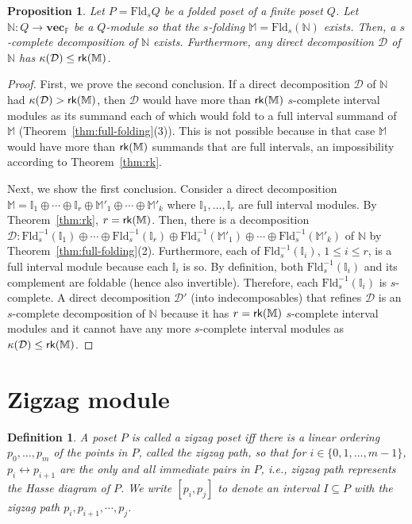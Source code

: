 \documentclass[11pt]{article}
\theoremstyle{plain}%
\newtheorem{proposition}{Proposition}[section]
\newtheorem{definition}{Definition}[section]
\newcommand{\Int}{\mathbb{I}}
\newcommand{\N}{\mathbb{N}}
\newcommand{\vecsp}{\mathbf{vec}_{\mathbb{F}}}
\newcommand{\M}{\mathbb{M}}
\newcommand{\D}{\mathcal{D}}
\newcommand{\Fld}{\mathrm{Fld}}
\newcommand{\rk}{{\sf{rk}}}
\begin{document}
\begin{proposition}
Let $P=\Fld_s Q$ be a folded poset of a finite poset $Q$.
Let $\N: Q\rightarrow \vecsp$ be a $Q$-module so that the $s$-folding
$\M=\Fld_s (\N)$ exists. Then, a $s$-complete decomposition of $\N$ exists. Furthermore, any direct decomposition $\D$ of $\N$ has $\kappa(\D)\leq \rk(\M)$.
\label{prop:complete-rank}
\end{proposition}
\begin{proof}
First, we prove the second conclusion. If a direct decomposition $\D$ of $\N$ had $\kappa(\D)>\rk(\M)$, then $\D$ would have more than $\rk(\M)$ $s$-complete interval modules as its summand each of which would fold to a full interval summand of $\M$ (Theorem~\ref{thm:full-folding}(3)). This is not possible because in that case $\M$ would have more than $\rk(\M)$ summands that are full intervals, an impossibility according to Theorem~\ref{thm:rk}.

Next, we show the first conclusion.
Consider a direct decomposition
$\M=\Int_1\oplus\cdots\oplus\Int_r\oplus \M'_1\oplus\cdots\oplus\M'_k$ where $\Int_1,\ldots,\Int_r$
are full interval modules. By Theorem~\ref{thm:rk}, $r=\rk(\M)$. Then, there is 
a decomposition $\D: \Fld_s^{-1}(\Int_1)\oplus\cdots\oplus\Fld_s^{-1}(\Int_r)\oplus \Fld_s^{-1}(\M'_1)\oplus\cdots\oplus\Fld_s^{-1}(\M'_k)$ of $\N$ by Theorem~\ref{thm:full-folding}(2). Furthermore, each of $\Fld_s^{-1}(\Int_i)$, $1\leq i\leq r$, is a full interval module because each $\Int_i$ is so. By definition, both $\Fld_s^{-1}(\Int_i)$ and its complement are foldable (hence also invertible). Therefore, each $\Fld_s^{-1}(\Int_i)$ is $s$-complete. A direct decomposition $\D'$ (into indecomposables) that refines $\D$
is an $s$-complete decomposition of $\N$ because it has $r=\rk(\M)$ $s$-complete
interval modules and it cannot have any more $s$-complete interval modules as $\kappa(\D)\leq \rk(\M)$. 
\end{proof}

\section{Zigzag module}
\label{sec:zigzag}
\begin{definition}
A poset $P$ is called a \emph{zigzag} poset iff there is a 
linear ordering $p_0,\ldots,p_m$
of the points in $P$, called the \emph{zigzag} path, so that 
for $i\in \{0,1,\ldots, m-1\}$, $p_i\leftrightarrow p_{i+1}$ are the only and all immediate pairs in $P$, i.e., zigzag path represents the Hasse diagram of $P$. We write $[p_i,p_j]$ to denote an interval
$I\subseteq P$ with the zigzag path $p_i,p_{i+1},\cdots, p_j$.
\end{definition}
\end{document}
